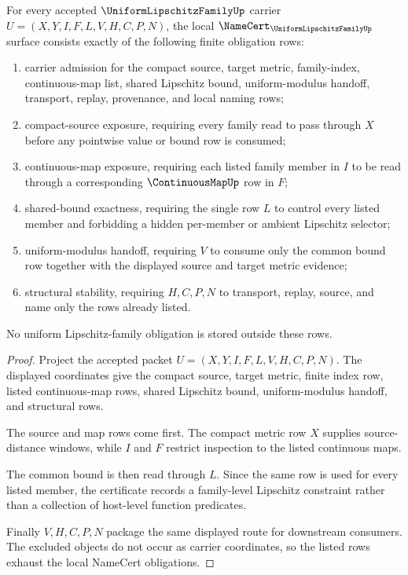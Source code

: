 \begin{theorem}
\label{thm:uniform-lipschitz-family-namecert-obligations}
For every accepted $\UniformLipschitzFamilyUp$ carrier $U=(X,Y,I,F,L,V,H,C,P,N)$, the local $\NameCert_{\UniformLipschitzFamilyUp}$ surface consists exactly of the following finite obligation rows:
\begin{enumerate}
\item carrier admission for the compact source, target metric, family-index, continuous-map list, shared Lipschitz bound, uniform-modulus handoff, transport, replay, provenance, and local naming rows;
\item compact-source exposure, requiring every family read to pass through $X$ before any pointwise value or bound row is consumed;
\item continuous-map exposure, requiring each listed family member in $I$ to be read through a corresponding $\ContinuousMapUp$ row in $F$;
\item shared-bound exactness, requiring the single row $L$ to control every listed member and forbidding a hidden per-member or ambient Lipschitz selector;
\item uniform-modulus handoff, requiring $V$ to consume only the common bound row together with the displayed source and target metric evidence;
\item structural stability, requiring $H,C,P,N$ to transport, replay, source, and name only the rows already listed.
\end{enumerate}
No uniform Lipschitz-family obligation is stored outside these rows.
\end{theorem}
\begin{proof}
Project the accepted packet $U=(X,Y,I,F,L,V,H,C,P,N)$. The displayed coordinates give the compact source, target metric, finite index row, listed continuous-map rows, shared Lipschitz bound, uniform-modulus handoff, and structural rows.

The source and map rows come first. The compact metric row $X$ supplies source-distance windows, while $I$ and $F$ restrict inspection to the listed continuous maps.

The common bound is then read through $L$. Since the same row is used for every listed member, the certificate records a family-level Lipschitz constraint rather than a collection of host-level function predicates.

Finally $V,H,C,P,N$ package the same displayed route for downstream consumers. The excluded objects do not occur as carrier coordinates, so the listed rows exhaust the local NameCert obligations.
\end{proof}

